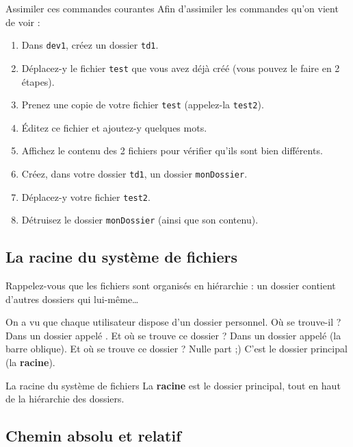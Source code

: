 \documentclass[a4paper,11pt]{style-esi/td}
\begin{document}
		\begin{Exercice}{Assimiler ces commandes courantes}
			Afin d'assimiler les commandes qu'on vient de voir :
			\begin{enumerate}
			\item Dans \texttt{dev1}, créez un dossier \texttt{td1}. 
			\item Déplacez-y le fichier \texttt{test} que vous avez déjà créé
				(vous pouvez le faire en 2 étapes).
			\item Prenez une copie de votre fichier \verb_test_ (appelez-la \verb_test2_).
			\item Éditez ce fichier et ajoutez-y quelques mots.
			\item Affichez le contenu des 2 fichiers pour vérifier qu'ils sont bien différents.
			\item Créez, dans votre dossier \verb_td1_, un dossier \verb_monDossier_.
			\item Déplacez-y votre fichier \verb_test2_.
			\item Détruisez le dossier \verb_monDossier_ (ainsi que son contenu).
			\end{enumerate}
		\end{Exercice}

	\subsection{La racine du système de fichiers}

		Rappelez-vous que les fichiers sont organisés en hiérarchie :
		un dossier contient d'autres dossiers qui lui-même\dots

		On a vu que chaque utilisateur dispose d'un dossier personnel. 
		Où se trouve-il ? Dans un dossier appelé . 
		Et où se trouve ce dossier  ? 
		Dans un dossier appelé \og{}\samp{/}\fg{} (la barre oblique). 
		Et où se trouve ce dossier \og{}\samp{/}\fg{} ? Nulle part ;) 
		C'est le dossier principal (la \textbf{racine}).

		\begin{theorie}{La racine du système de fichiers}
			La \textbf{racine} est le dossier principal, 
			tout en haut de la hiérarchie des dossiers.
		\end{theorie}

	\subsection{Chemin absolu et relatif}
\end{document}
